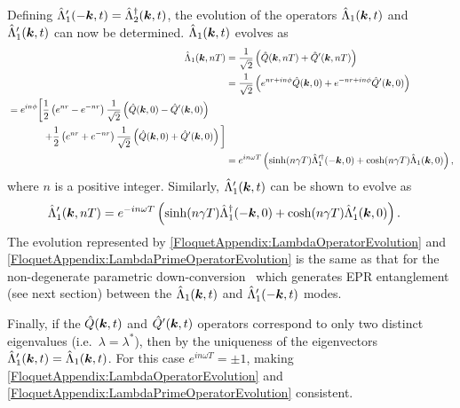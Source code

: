 Defining $\hat{\Lambda}_1'(-\bm{k}, t) = \hat{\Lambda}_2^\dagger(\bm{k}, t)$, the evolution of the operators $\hat{\Lambda}_1(\bm{k}, t)$ and $\hat{\Lambda}_1'(\bm{k}, t)$ can now be determined. $\hat{\Lambda}_1(\bm{k}, t)$ evolves as
\begin{align}
    \hat{\Lambda}_1(\vect{k}, nT) &= \frac{1}{\sqrt{2}} \left(\hat{Q}(\vect{k}, nT) + \hat{Q}'(\vect{k}, nT) \right) \\
        &= \frac{1}{\sqrt{2}} \left( e^{nr + i n\phi} \hat{Q}(\vect{k}, 0) + e^{-nr + i n \phi}\hat{Q}'(\vect{k}, 0)\right) \\
        \begin{split}
            &=  e^{i n \phi} \bigg[ \frac{1}{2}\left( e^{nr} - e^{-nr}\right)\frac{1}{\sqrt{2}}\left(\hat{Q}(\vect{k}, 0) - \hat{Q}'(\vect{k}, 0) \right) \\
            &\relphantom{=e^{i n \phi}\bigg[} + \frac{1}{2} \left( e^{nr} + e^{-nr}\right)\frac{1}{\sqrt{2}} \left( \hat{Q}(\vect{k}, 0) + \hat{Q}'(\vect{k}, 0)\right)\bigg]
        \end{split}\\
        &= e^{i n \omega T} \left( \sinh(n\gamma T) \hat{\Lambda}_1'^\dagger(-\vect{k}, 0) + \cosh(n \gamma T) \hat{\Lambda}_1(\vect{k}, 0)\right), \label{FloquetAppendix:LambdaOperatorEvolution}
\end{align}
where $n$ is a positive integer. Similarly, $\hat{\Lambda}_1'(\bm{k}, t)$ can be shown to evolve as
\begin{align}
    \hat{\Lambda}_1'(\vect{k}, nT) &= e^{-i n \omega T} \left( \sinh(n \gamma T) \hat{\Lambda}_1^\dagger(-\vect{k}, 0) + \cosh(n \gamma T) \hat{\Lambda}_1'(\vect{k}, 0)\right). \label{FloquetAppendix:LambdaPrimeOperatorEvolution}
\end{align}
The evolution represented by \eqref{FloquetAppendix:LambdaOperatorEvolution} and \eqref{FloquetAppendix:LambdaPrimeOperatorEvolution} is the same as that for the non-degenerate parametric down-conversion~\citep{WallsMilburn} which generates EPR entanglement (see next section) between the $\hat{\Lambda}_1(\bm{k}, t)$ and $\hat{\Lambda}_1'(-\bm{k}, t)$ modes.

Finally, if the $\hat{Q}(\bm{k}, t)$ and $\hat{Q}'(\bm{k}, t)$ operators correspond to only two distinct eigenvalues (i.e.\ $\lambda = \lambda^*$), then by the uniqueness of the eigenvectors $\hat{\Lambda}_1'(\bm{k}, t) = \hat{\Lambda}_1(\bm{k}, t)$. For this case $\displaystyle e^{i n\omega T} = \pm 1$, making \eqref{FloquetAppendix:LambdaOperatorEvolution} and \eqref{FloquetAppendix:LambdaPrimeOperatorEvolution} consistent.


